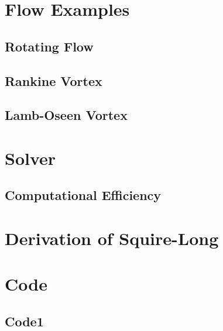 \documentclass{X:/Documents/Coding/Latex/myreport}
\theoremstyle{plain}
\theoremstyle{definition}
\theoremstyle{remark}
\numberwithin{equation}{section}
\numberwithin{figure}{section}
\begin{document}

\chapter{Flow Examples}
\section{Rotating Flow}
\section{Rankine Vortex}
\section{Lamb-Oseen Vortex}

\chapter{Solver}

\section{Computational Efficiency}


\begin{appendices}
\chapter{Derivation of Squire-Long}
\chapter{Code}
\section{Code1}
	
\end{appendices}
\end{document}
